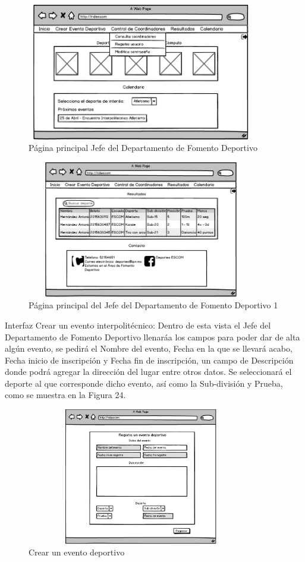 	\pagebreak
	
	\begin{figure}[hbt!]
		\centering
		\includegraphics[width=10cm, height=6cm]{Imagenes/Disenos/InicioJFDopciones.png}
		\caption{Página principal Jefe del Departamento de Fomento Deportivo}
	\end{figure}
	\begin{figure}[hbt!]
		\centering
		\includegraphics[width=10cm, height=6cm]{Imagenes/Disenos/Inicio1JFD.png}
		\caption{Página principal del Jefe del Departamento de Fomento Deportivo 1}
	\end{figure}
	
	Interfaz Crear un evento interpolitécnico: Dentro de esta vista el Jefe del Departamento de Fomento Deportivo llenaráa los campos para poder dar de alta algún evento, se pedirá el Nombre del evento, Fecha en la que se llevará acabo, Fecha inicio de inscripción y Fecha fin de inscripción, un campo de Descripción donde podrá agregar la dirección del lugar entre otros datos. Se seleccionará el deporte al que corresponde dicho evento, así como la Sub-división y Prueba, como se muestra en la Figura 24.
	\pagebreak
	\begin{figure}[hbt!]
		\centering
		\includegraphics[width=10cm, height=6cm]{Imagenes/Disenos/Registrauneventodeportivo.png}
		\caption{Crear un evento deportivo}
	\end{figure}
	
